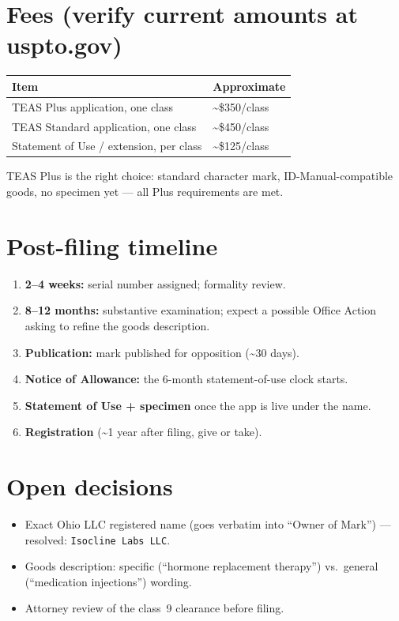\documentclass[11pt,a4paper]{article}
\newcommand{\code}[1]{\texttt{\small #1}}
\begin{document}
\section{Fees (verify current amounts at uspto.gov)}

\begin{center}
\begin{tabular}{@{}ll@{}}
\toprule
\textbf{Item} & \textbf{Approximate} \\
\midrule
TEAS Plus application, one class & \textasciitilde\$350/class \\
TEAS Standard application, one class & \textasciitilde\$450/class \\
Statement of Use / extension, per class & \textasciitilde\$125/class \\
\bottomrule
\end{tabular}
\end{center}

\noindent
TEAS Plus is the right choice: standard character mark, ID-Manual-compatible
goods, no specimen yet --- all Plus requirements are met.

\section{Post-filing timeline}

\begin{enumerate}[leftmargin=1.6em,itemsep=0.1em]
\item \textbf{2--4 weeks:} serial number assigned; formality review.
\item \textbf{8--12 months:} substantive examination; expect a possible Office
      Action asking to refine the goods description.
\item \textbf{Publication:} mark published for opposition (\textasciitilde30 days).
\item \textbf{Notice of Allowance:} the 6-month statement-of-use clock starts.
\item \textbf{Statement of Use + specimen} once the app is live under the name.
\item \textbf{Registration} (\textasciitilde1 year after filing, give or take).
\end{enumerate}

\section{Open decisions}

\begin{itemize}[leftmargin=1.4em,itemsep=0.2em]
\item[$\square$] Exact Ohio LLC registered name (goes verbatim into
      ``Owner of Mark'') --- resolved: \code{Isocline Labs LLC}.
\item[$\square$] Goods description: specific (``hormone replacement therapy'')
      vs.\ general (``medication injections'') wording.
\item[$\square$] Attorney review of the class~9 clearance before filing.
\end{itemize}
\end{document}
